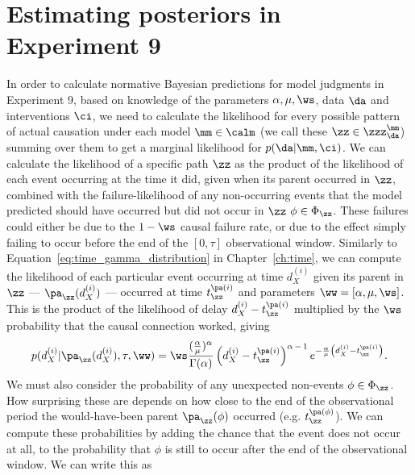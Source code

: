 \section{Estimating posteriors in Experiment 9}

In order to calculate normative Bayesian predictions for model judgments in Experiment 9, based on knowledge of the parameters $\alpha, \mu,\ws$, data $\da$ and interventions $\ci$, we need to calculate the likelihood for every possible pattern of actual causation under each model $\mm\in\calm$ (we call these $\zz\in \zzz_{\da}^{\mm}$) summing over them to get a marginal likelihood for $p(\da|\mm,\ci)$.  We can calculate the likelihood of a specific path $\zz$ as the product of the likelihood of each event occurring at the time it did, given when its parent occurred in $\zz$, combined with the failure-likelihood of any non-occurring events that the model predicted should have occurred but did not occur in $\zz$ $\phi\in\Phi_{\zz}$.  These failures could either be due to the $1-\ws$ causal failure rate, or due to the effect simply failing to occur before the end of the $[0,\tau]$ observational window.  Similarly to Equation~\ref{eq:time_gamma_distribution} in Chapter~\ref{ch:time}, we can compute the likelihood of each particular event occurring at time $d^{(i)}_X$ given its parent in $\zz$ --- $\pa_{\zz}(d^{(i)}_X)$ --- occurred at time $t^{\pa(i)}_{\zz}$ and parameters $\ww = [\alpha, \mu,\ws]$.  This is the product of the likelihood of delay $d^{(i)}_X - t^{\pa(i)}_{\zz}$ multiplied by the $\ws$ probability that the causal connection worked, giving
\begin{equation}
p(d^{(i)}_X |\pa_{\zz}(d^{(i)}_X), \tau, \ww) = \ws \frac{(\frac{\alpha}{\mu})^\alpha}{\Gamma(\alpha)} \left(d^{(i)}_X - t^{\pa(i)}_{\zz}\right)^{\alpha \,-\, 1} e^{- \frac{\alpha}{\mu} \left(d^{(i)}_X -t^{\pa(i)}_{\zz}\right) } .
\end{equation}
We must also consider the probability of any unexpected non-events $\phi\in\Phi_{\zz}$.  How surprising these are depends on how close to the end of the observational period the would-have-been parent $\pa_{\zz}(\phi)$ occurred (e.g. $t^{\pa(\phi)}_{\zz}$).  We can compute these probabilities by adding the chance that the event does not occur at all, to the probability that $\phi$ is still to occur after the end of the observational window.  We can write this as

